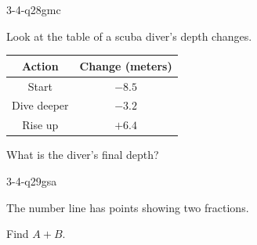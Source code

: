 \begin{practiceQuestion}{3-4-q28}{gmc}
\begin{questionText}
Look at the table of a scuba diver's depth changes.

\begin{center}
\begin{tabular}{|c|c|}
\hline
\textbf{Action} & \textbf{Change (meters)} \\
\hline
Start & $-8.5$ \\
\hline
Dive deeper & $-3.2$ \\
\hline
Rise up & $+6.4$ \\
\hline
\end{tabular}
\end{center}

What is the diver's final depth?
\end{questionText}
\end{practiceQuestion}

\begin{practiceQuestion}{3-4-q29}{gsa}
\begin{questionText}
The number line has points showing two fractions.

\begin{center}
\end{center}

Find $A + B$.
\end{questionText}
\end{practiceQuestion}

